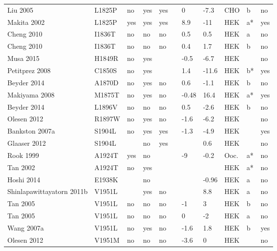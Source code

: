 \begin{tiny}
\begin{longtable}{p{4cm}|l|llll|ll|lll}
Liu 2005\cite{Liu2005MutationDB} & L1825P & no & yes & yes &  & 0 & -7.3 & CHO & b & no \\
Makita 2002\cite{Makita2002MutationDB} & L1825P & yes & yes & yes &  & 8.9 & -11 & HEK & a* & yes \\
Cheng 2010\cite{Cheng2010MutationDB} & I1836T & no & no & no &  & 0.5 & 0.5 & HEK & a & no \\
Cheng 2010\cite{Cheng2010MutationDB} & I1836T & no & no & no &  & 0.4 & 1.7 & HEK & b & no \\
Musa 2015\cite{Musa2015MutationDB} & H1849R & no & yes &  &  & -0.5 & -6.7 & HEK &  & no \\
Petitprez 2008\cite{Petitprez2008MutationDB} & C1850S & no & yes &  &  & 1.4 & -11.6 & HEK & b* & yes \\
Beyder 2014\cite{Beyder2014MutationDB} & A1870D & no & yes & no &  & 0.6 & -1.1 & HEK & b & no \\
Makiyama 2008\cite{Makiyama2008MutationDB} & M1875T & no & yes & no &  & -0.48 & 16.4 & HEK & a* & yes \\
Beyder 2014\cite{Beyder2014MutationDB} & L1896V & no & no & no &  & 0.5 & -2.6 & HEK & b & no \\
Olesen 2012\cite{Olesen2012MutationDB} & R1897W & no & yes & no &  & -1.6 & -6.2 & HEK &  & no \\
Bankston 2007a\cite{Bankston2007aMutationDB} & S1904L & no & yes & yes &  & -1.3 & -4.9 & HEK &  & yes \\
Glaaser 2012\cite{Glaaser2012MutationDB} & S1904L &  & no & yes &  &  & 0.6 & HEK &  & no \\
Rook 1999\cite{Rook1999MutationDB} & A1924T & yes & no &  &  & -9 & -0.2 & Ooc. & a* & no \\
Tan 2002\cite{Tan2002MutationDB} & A1924T & no & yes &  &  &  &  & HEK & a* & no \\
Hoshi 2014\cite{Hoshi2014MutationDB} & E1938K &  & no &  &  &  & -0.96 & HEK & a & no \\
Shinlapawittayatorn 2011b\cite{Shinlapawittayatorn2011bMutationDB} & V1951L &  & yes & no &  &  & 8.8 & HEK & a & no \\
Tan 2005\cite{Tan2005MutationDB} & V1951L & no & no & no &  & -1 & 3 & HEK & b & no \\
Tan 2005\cite{Tan2005MutationDB} & V1951L & no & no & no &  & 0 & -2 & HEK & a & no \\
Wang 2007a\cite{Wang2007aMutationDB} & V1951L & no & yes & no &  & -1.6 & 1.8 & HEK & b & yes \\
Olesen 2012\cite{Olesen2012MutationDB} & V1951M & no & no & no &  & -3.6 & 0 & HEK &  & no \\

\end{longtable}
\end{tiny}

